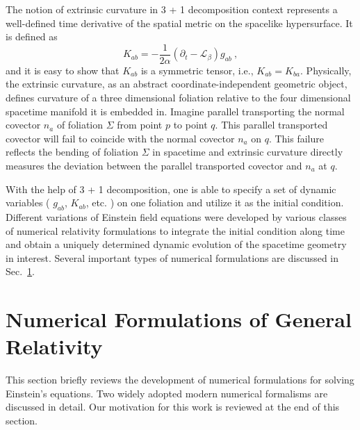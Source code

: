 The notion of extrinsic curvature in 3 + 1 decomposition context represents a well-defined time derivative of the spatial metric on the spacelike hypersurface. It is defined as
\begin{equation}\label{extrinsic}
K_{ab} = - \frac{1}{2\alpha}(\partial_{t} - \mathcal{L}_{\beta})g_{ab} \ ,
\end{equation}
and it is easy to show that $K_{ab}$ is a symmetric tensor, i.e., $K_{ab} = K_{ba}$. Physically, the extrinsic curvature, as an abstract coordinate-independent geometric object, defines curvature of a three dimensional foliation relative to the four dimensional spacetime manifold it is embedded in. Imagine parallel transporting the normal covector $n_{a}$ of foliation $\Sigma$ from point $p$ to point $q$. This parallel transported covector will fail to coincide with the normal covector $n_{a}$ on $q$. This failure reflects the bending of foliation $\Sigma$ in spacetime and extrinsic curvature directly measures the deviation between the parallel transported covector and $n_{a}$ at $q$. 

With the help of 3 + 1 decomposition, one is able to specify a set of dynamic variables ( $g_{ab}$, $K_{ab}$, etc. ) on one foliation and utilize it as the initial condition. Different variations of Einstein field equations were developed by various classes of numerical relativity formulations to integrate the initial condition along time and obtain a uniquely determined dynamic evolution of the spacetime geometry in interest. Several important types of  numerical formulations are discussed in Sec.~\ref{numericalformulation}.  

\section{Numerical Formulations of General Relativity}\label{numericalformulation}
This section briefly reviews the development of numerical formulations for solving Einstein's equations. Two widely adopted modern numerical formalisms are discussed in detail. Our motivation for this work is reviewed at the end of this section. 

